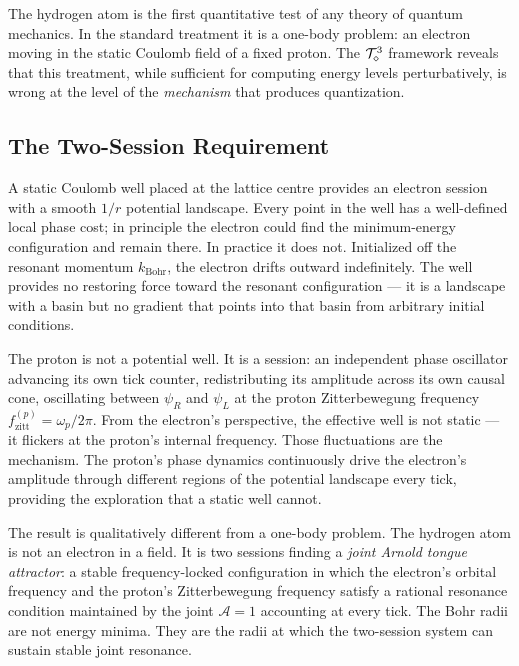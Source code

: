 
\label{sec:hydrogen}

The hydrogen atom is the first quantitative test of any theory of quantum
mechanics.
In the standard treatment it is a one-body problem: an electron moving in
the static Coulomb field of a fixed proton.
The $\mathcal{T}_\diamond^3$ framework reveals that this treatment, while sufficient
for computing energy levels perturbatively, is wrong at the level of the
\emph{mechanism} that produces quantization.

\subsection{The Two-Session Requirement}
\label{subsec:two_session}

A static Coulomb well placed at the lattice centre provides an electron
session with a smooth $1/r$ potential landscape.
Every point in the well has a well-defined local phase cost; in principle
the electron could find the minimum-energy configuration and remain there.
In practice it does not.
Initialized off the resonant momentum $k_\text{Bohr}$, the electron drifts
outward indefinitely.
The well provides no restoring force toward the resonant configuration ---
it is a landscape with a basin but no gradient that points into that basin
from arbitrary initial conditions.

The proton is not a potential well.
It is a session: an independent phase oscillator advancing its own tick counter,
redistributing its amplitude across its own causal cone, oscillating between
$\psi_R$ and $\psi_L$ at the proton Zitterbewegung frequency
$f_\text{zitt}^{(p)} = \omega_p / 2\pi$.
From the electron's perspective, the effective well is not static ---
it flickers at the proton's internal frequency.
Those fluctuations are the mechanism.
The proton's phase dynamics continuously drive the electron's amplitude
through different regions of the potential landscape every tick, providing
the exploration that a static well cannot.

The result is qualitatively different from a one-body problem.
The hydrogen atom is not an electron in a field.
It is two sessions finding a \emph{joint Arnold tongue attractor}:
a stable frequency-locked configuration in which the electron's
orbital frequency and the proton's Zitterbewegung frequency
satisfy a rational resonance condition maintained by the joint
$\mathcal{A}=1$ accounting at every tick.
The Bohr radii are not energy minima.
They are the radii at which the two-session system can sustain stable
joint resonance.

